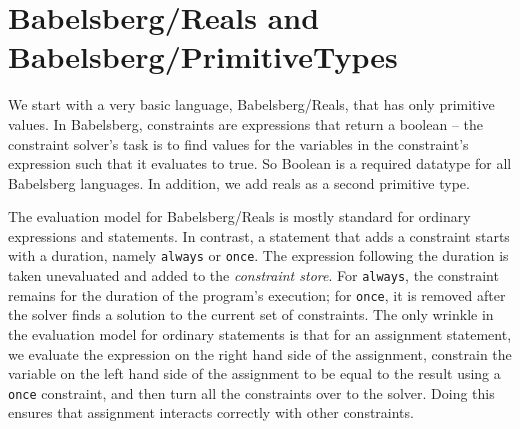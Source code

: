 \documentclass{article}
\begin{document}

\section{Babelsberg/Reals and Babelsberg/PrimitiveTypes}
\label{sec:babelsberg-primitivetypes}

We start with a very basic language, Babelsberg/Reals, that has only
primitive values. In Babelsberg, constraints are expressions that
return a boolean -- the constraint solver's task is to find values for
the variables in the constraint's expression such that it
evaluates to true. So Boolean is a required datatype for
all Babelsberg languages. In addition, we add reals as a second
primitive type.

The evaluation model for Babelsberg/Reals is mostly standard for
ordinary expressions and statements.  In contrast, a statement that
adds a constraint starts with a duration, namely \verb|always| or
\verb|once|.  The expression following the duration is taken
unevaluated and added to the \emph{constraint store}.  For
\verb|always|, the constraint remains for the duration of the
program's execution; for \verb|once|, it is removed after the solver
finds a solution to the current set of constraints.  The only wrinkle
in the evaluation model for ordinary statements is that for an
assignment statement, we evaluate the expression on the right hand
side of the assignment, constrain the variable on the left hand side
of the assignment to be equal to the result using a \verb|once|
constraint, and then turn all the constraints over to the solver.
Doing this ensures that assignment interacts correctly with other
constraints.
\end{document}

